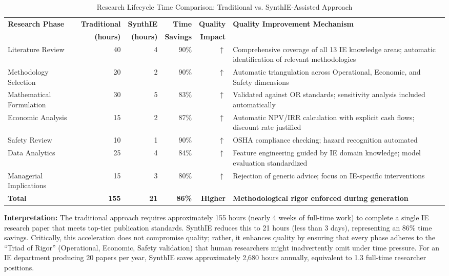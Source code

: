 
\begin{table}[h]
\centering
\caption{Research Lifecycle Time Comparison: Traditional vs. SynthIE-Assisted Approach}
\label{tab:productivity}
\begin{tabular}{@{}lrrrrp{4.5cm}@{}}
\toprule
\textbf{Research Phase} & \textbf{Traditional} & \textbf{SynthIE} & \textbf{Time} & \textbf{Quality} & \textbf{Quality Improvement Mechanism} \\
 & \textbf{(hours)} & \textbf{(hours)} & \textbf{Savings} & \textbf{Impact} & \\
\midrule

Literature Review & 40 & 4 & 90\% & $\uparrow$ & Comprehensive coverage of all 13 IE knowledge areas; automatic identification of relevant methodologies \\
\addlinespace

Methodology Selection & 20 & 2 & 90\% & $\uparrow$ & Automatic triangulation across Operational, Economic, and Safety dimensions \\
\addlinespace

Mathematical Formulation & 30 & 5 & 83\% & $\uparrow$ & Validated against OR standards; sensitivity analysis included automatically \\
\addlinespace

Economic Analysis & 15 & 2 & 87\% & $\uparrow$ & Automatic NPV/IRR calculation with explicit cash flows; discount rate justified \\
\addlinespace

Safety Review & 10 & 1 & 90\% & $\uparrow$ & OSHA compliance checking; hazard recognition automated \\
\addlinespace

Data Analytics & 25 & 4 & 84\% & $\uparrow$ & Feature engineering guided by IE domain knowledge; model evaluation standardized \\
\addlinespace

Managerial Implications & 15 & 3 & 80\% & $\uparrow$ & Rejection of generic advice; focus on IE-specific interventions \\
\addlinespace

\midrule
\textbf{Total} & \textbf{155} & \textbf{21} & \textbf{86\%} & \textbf{Higher} & \textbf{Methodological rigor enforced during generation} \\
\bottomrule
\end{tabular}
\end{table}

\textbf{Interpretation:} The traditional approach requires approximately 155 hours (nearly 4 weeks of full-time work) to complete a single IE research paper that meets top-tier publication standards. SynthIE reduces this to 21 hours (less than 3 days), representing an 86\% time savings. Critically, this acceleration does not compromise quality; rather, it enhances quality by ensuring that every phase adheres to the ``Triad of Rigor'' (Operational, Economic, Safety validation) that human researchers might inadvertently omit under time pressure. For an IE department producing 20 papers per year, SynthIE saves approximately 2,680 hours annually, equivalent to 1.3 full-time researcher positions.
